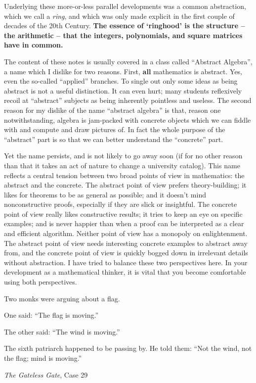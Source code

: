 Underlying these more-or-less parallel developments was a common abstraction, which we call a \emph{ring}, and which was only made explicit in the first couple of decades of the 20th Century.
\textbf{The essence of `ringhood' is the structure -- the arithmetic -- that the integers, polynomials, and square matrices have in common.}

The content of these notes is usually covered in a class called ``Abstract Algebra'', a name which I dislike for two reasons.
First, \textbf{all} mathematics is abstract.
Yes, even the so-called ``applied'' branches.
To single out only some ideas as being abstract is not a useful distinction.
It can even hurt; many students reflexively recoil at ``abstract'' subjects as being inherently pointless and useless.
The second reason for my dislike of the name ``abstract algebra'' is that, reason one notwithstanding, algebra is jam-packed with concrete objects which we can fiddle with and compute and draw pictures of.
In fact the whole purpose of the ``abstract'' part is so that we can better understand the ``concrete'' part.

Yet the name persists, and is not likely to go away soon (if for no other reason than that it takes an act of nature to change a university catalog).
This name reflects a central tension between two broad points of view in mathematics: the abstract and the concrete.
The abstract point of view prefers theory-building; it likes for theorems to be as general as possible; and it doesn't mind nonconstructive proofs, especially if they are slick or insightful.
The concrete point of view really likes constructive results; it tries to keep an eye on specific examples; and is never happier than when a proof can be interpreted as a clear and efficient algorithm.
Neither point of view has a monopoly on enlightenment.
The abstract point of view needs interesting concrete examples to abstract away from, and the concrete point of view is quickly bogged down in irrelevant details without abstraction.
I have tried to balance these two perspectives here.
In your development as a mathematical thinker, it is vital that you become comfortable using both perspectives.

\begin{center}
\begin{minipage}{0.7\textwidth}
Two monks were arguing about a flag.

One said: ``The flag is moving.''

The other said: ``The wind is moving.''

The sixth patriarch happened to be passing by.
He told them: ``Not the wind, not the flag; mind is moving.''

\hfill \emph{The Gateless Gate}, Case 29
\end{minipage}
\end{center}
